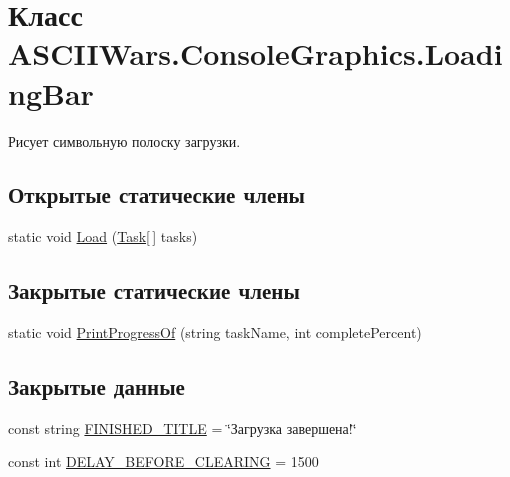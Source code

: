\hypertarget{class_a_s_c_i_i_wars_1_1_console_graphics_1_1_loading_bar}{}\section{Класс A\+S\+C\+I\+I\+Wars.\+Console\+Graphics.\+Loading\+Bar}
\label{class_a_s_c_i_i_wars_1_1_console_graphics_1_1_loading_bar}


Рисует символьную полоску загрузки.  


\subsection*{Открытые статические члены}
\begin{DoxyCompactItemize}
\item 
static void \hyperlink{class_a_s_c_i_i_wars_1_1_console_graphics_1_1_loading_bar_a608770219ead82a4ce54ad22f6c3ba38}{Load} (\hyperlink{class_a_s_c_i_i_wars_1_1_console_graphics_1_1_task}{Task}\mbox{[}$\,$\mbox{]} tasks)
\end{DoxyCompactItemize}
\subsection*{Закрытые статические члены}
\begin{DoxyCompactItemize}
\item 
static void \hyperlink{class_a_s_c_i_i_wars_1_1_console_graphics_1_1_loading_bar_a5a407d4e78a5d3789ba0348b219b14ae}{Print\+Progress\+Of} (string task\+Name, int complete\+Percent)
\end{DoxyCompactItemize}
\subsection*{Закрытые данные}
\begin{DoxyCompactItemize}
\item 
const string \hyperlink{class_a_s_c_i_i_wars_1_1_console_graphics_1_1_loading_bar_aa75543e5166964ca32750bb66591ab3d}{F\+I\+N\+I\+S\+H\+E\+D\+\_\+\+T\+I\+T\+LE} = \char`\"{}Загрузка завершена!\char`\"{}
\item 
const int \hyperlink{class_a_s_c_i_i_wars_1_1_console_graphics_1_1_loading_bar_ae05f622988d5cebaa3e0c14d45d832fb}{D\+E\+L\+A\+Y\+\_\+\+B\+E\+F\+O\+R\+E\+\_\+\+C\+L\+E\+A\+R\+I\+NG} = 1500
\end{DoxyCompactItemize}


